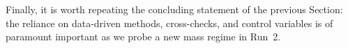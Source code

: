 Finally, it is worth repeating the concluding statement of the
previous Section: the reliance on data-driven methods, cross-checks,
and control variables is of paramount important as we probe a new mass
regime in Run~2.




